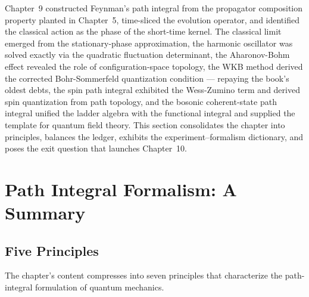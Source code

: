 Chapter~9 constructed Feynman's path integral from the propagator composition property planted in Chapter~5, time-sliced the evolution operator, and identified the classical action as the phase of the short-time kernel. The classical limit emerged from the stationary-phase approximation, the harmonic oscillator was solved exactly via the quadratic fluctuation determinant, the Aharonov-Bohm effect revealed the role of configuration-space topology, the WKB method derived the corrected Bohr-Sommerfeld quantization condition --- repaying the book's oldest debts, the spin path integral exhibited the Wess-Zumino term and derived spin quantization from path topology, and the bosonic coherent-state path integral unified the ladder algebra with the functional integral and supplied the template for quantum field theory. This section consolidates the chapter into principles, balances the ledger, exhibits the experiment--formalism dictionary, and poses the exit question that launches Chapter~10.

\section{Path Integral Formalism: A Summary}
\label{sec:ch9summary}

\subsection{Five Principles}

The chapter's content compresses into seven principles that characterize the path-integral formulation of quantum mechanics.

